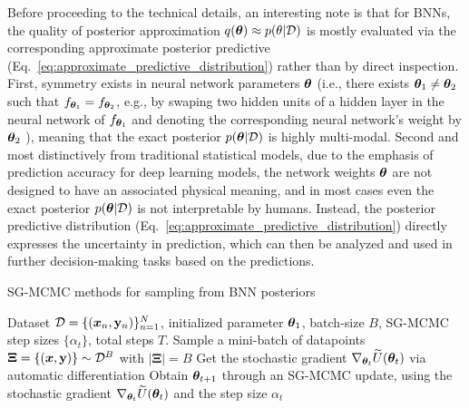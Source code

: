 Before proceeding to the technical details, an interesting note is that for BNNs, the quality of posterior approximation $q(\bm{\theta}) \approx p(\theta | \mathcal{D})$ is mostly evaluated via the corresponding approximate posterior predictive  (Eq.~\eqref{eq:approximate_predictive_distribution}) rather than by direct inspection. First, symmetry exists in neural network parameters $\bm{\theta}$ (i.e., there exists $\bm{\theta}_1 \neq \bm{\theta}_2$ such that $f_{\bm{\theta}_1} = f_{\bm{\theta}_2}$, e.g., by swaping two hidden units of a hidden layer in the neural network of $f_{\bm{\theta}_1}$ and denoting the corresponding neural network's weight by $\bm{\theta}_2$ \citep{phuong2020functional,rolnick2020reverse}), meaning that the exact posterior $p(\bm{\theta} | \mathcal{D})$ is highly multi-modal. Second and most distinctively from traditional statistical models, due to the emphasis of prediction accuracy for deep learning models, the network weights $\bm{\theta}$ are not designed to have an associated physical meaning, and in most cases even the exact posterior $p(\bm{\theta} | \mathcal{D})$ is not interpretable by humans. Instead, the posterior predictive distribution (Eq.~\eqref{eq:approximate_predictive_distribution}) directly expresses the uncertainty in prediction, which can then be analyzed and used in further decision-making tasks based on the predictions.


\begin{algorithm}[t]
\caption{SG-MCMC methods for sampling from BNN posteriors}\label{alg:sgmcmc_bnn}
\begin{algorithmic}[1]
\Require Dataset $\mathcal{D} = \{ (\bm{x}_n, \mathbf{y}_n) \}_{n=1}^N$, initialized parameter $\bm{\theta}_1$,  batch-size $B$, SG-MCMC step sizes $\{\alpha_t \}$, total steps $T$.
\State Sample a mini-batch of datapoints $\bm{\Xi} = \{ (\bm{x}, \mathbf{y}) \} \sim \mathcal{D}^B$ with $| \bm{\Xi} | = B$
\State Get the stochastic gradient $\nabla_{\bm{\theta}_t}\widetilde{U}(\bm{\theta}_t)$ via automatic differentiation
\State Obtain $\bm{\theta}_{t+1}$ through an SG-MCMC update, using the stochastic gradient $\nabla_{\bm{\theta}_t}\widetilde{U}(\bm{\theta}_t)$ and the step size $\alpha_t$
\EndFor
\end{algorithmic}
\end{algorithm}

